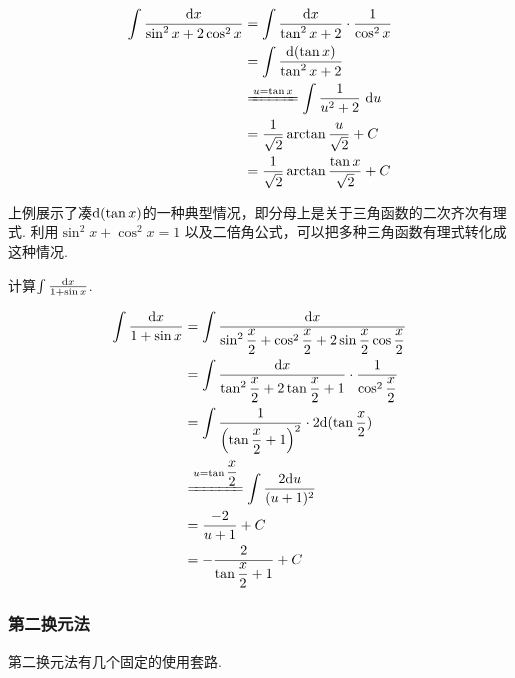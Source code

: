 \begin{solution}
\begin{equation}
    \begin{aligned}
        \int \frac{\d x}{\sin^2 x + 2\cos^2 x}
        &= \int \frac{\d x}{\tan^2 x +2} \cdot \frac{1}{\cos^2 x} \\
        &= \int \frac{\d(\tan x)}{\tan^2 x +2} \\
        &\xlongequal{u = \tan x} \int \frac{1}{u^2+2} ~\d u  \\
        &= \frac{1}{\sqrt{2}}\arctan{\frac{u}{\sqrt{2}}} +C \\
        &= \frac{1}{\sqrt{2}}\arctan{\frac{\tan x}{\sqrt{2}}} +C
        \nonumber
    \end{aligned}
\end{equation}
\end{solution}

上例展示了凑$\mathrm{d}(\tan x)$的一种典型情况，即分母上是关于三角函数的二次齐次有理式. 利用$\sin^2 x +\cos^2 x =1$
以及二倍角公式，可以把多种三角函数有理式转化成这种情况.

\begin{example}
\label{ex:ch03-12}
计算$\int \frac{\mathrm{d} x}{1+\sin x}$.
\end{example}

\begin{solution}
\begin{align*}
        \int \frac{\d x}{1+\sin x}
        &= \int \frac{\d x}{\sin^2{\displaystyle\frac{x}{2}}+\cos^2{\displaystyle\frac{x}{2}}+2\sin\displaystyle\frac{x}{2}\cos{\displaystyle\frac{x}{2}}} \\
        &= \int \frac{\d x}{\tan^2{\displaystyle\frac{x}{2}}+2\tan{\displaystyle\frac{x}{2}}+1}\cdot \frac{1}{\cos^2{\displaystyle\frac{x}{2}}} \\
        &= \int \frac{1}{\left( \tan{\displaystyle\frac{x}{2}}+1  \right)^2}\cdot 2 \d(\tan{\displaystyle\frac{x}{2}}) \\
        &\xlongequal{u=\tan{\displaystyle\frac{x}{2}}} \int \frac{2 \d u}{(u+1)^2} \\
        &= \frac{-2}{u+1} + C \\
        &= -\frac{2}{\tan{\displaystyle\frac{x}{2}}+1} + C
\end{align*}
\end{solution}

\subsubsection{第二换元法}\par
第二换元法有几个固定的使用套路.\vspace{1em}

